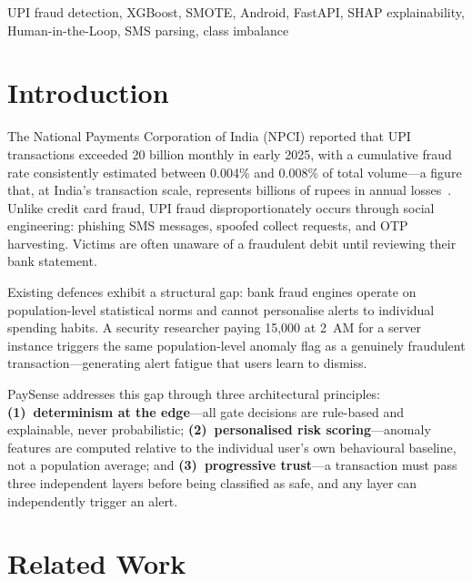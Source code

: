 \documentclass[conference]{IEEEtran}
\begin{document}
\begin{IEEEkeywords}
UPI fraud detection, XGBoost, SMOTE, Android, FastAPI, SHAP explainability,
Human-in-the-Loop, SMS parsing, class imbalance
\end{IEEEkeywords}

\section{Introduction}

The National Payments Corporation of India (NPCI) reported that UPI
transactions exceeded 20 billion monthly in early 2025, with a cumulative
fraud rate consistently estimated between 0.004\% and 0.008\% of total
volume---a figure that, at India's transaction scale, represents billions of
rupees in annual losses~\cite{npci2025}. Unlike credit card fraud, UPI fraud
disproportionately occurs through social engineering: phishing SMS messages,
spoofed collect requests, and OTP harvesting. Victims are often unaware of a
fraudulent debit until reviewing their bank statement.

Existing defences exhibit a structural gap: bank fraud engines operate on
population-level statistical norms and cannot personalise alerts to individual
spending habits. A security researcher paying \textrm{\rupee}15{,}000 at
2~AM for a server instance triggers the same population-level anomaly flag as
a genuinely fraudulent transaction---generating alert fatigue that users
learn to dismiss.

PaySense addresses this gap through three architectural principles:
\textbf{(1)~determinism at the edge}---all gate decisions are rule-based and
explainable, never probabilistic;
\textbf{(2)~personalised risk scoring}---anomaly features are computed
relative to the individual user's own behavioural baseline, not a population
average; and
\textbf{(3)~progressive trust}---a transaction must pass three independent
layers before being classified as safe, and any layer can independently
trigger an alert.

\section{Related Work}
\end{document}
